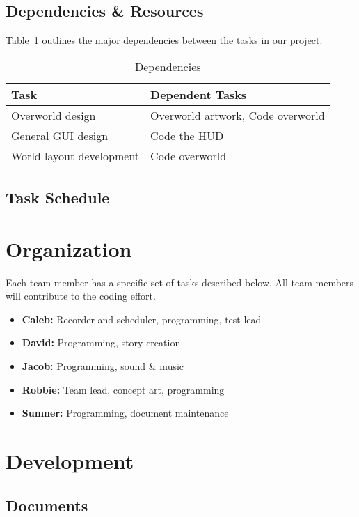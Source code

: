 \documentclass[12pt,titlepage]{article}
\begin{document}
\subsection{Dependencies \& Resources}
Table~\ref{tab:dependencies} outlines the major dependencies between the tasks
in our project.
\begin{table}[H]
    \caption{Dependencies}
    \label{tab:dependencies}
    \centering
    \begin{tabularx}{\linewidth}{|l|X|}
        \hline
        \textbf{Task} & \textbf{Dependent Tasks} \\
        \hline
        Overworld design & Overworld artwork, Code overworld \\
        General GUI design & Code the HUD \\
        World layout development & Code overworld \\
        \hline
    \end{tabularx}
\end{table}

\subsection{Task Schedule}

\section{Organization}
Each team member has a specific set of tasks described below. All team members
will contribute to the coding effort.
\begin{itemize}
    \item \textbf{Caleb:} Recorder and scheduler, programming, test lead
    \item \textbf{David:} Programming, story creation
    \item \textbf{Jacob:} Programming, sound \& music
    \item \textbf{Robbie:} Team lead, concept art, programming
    \item \textbf{Sumner:} Programming, document maintenance
\end{itemize}

\section{Development}

\subsection{Documents}
\end{document}
